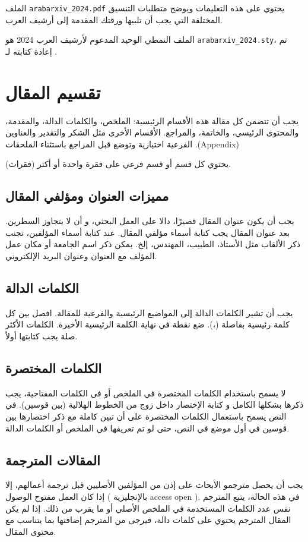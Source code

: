 \documentclass[12pt]{article}
\begin{document}
الملف \verb+arabarxiv_2024.pdf+ يحتوي على هذه التعليمات ويوضح متطلبات التنسيق المختلفة التي يجب أن تلبيها ورقتك المقدمة إلى أرشيف العرب.


الملف النمطي \XeLaTeX{} الوحيد المدعوم لأرشيف العرب 2024 هو \verb+arabarxiv_2024.sty+، تم إعادة كتابته لـ \XeLaTeX{}.

\section{تقسيم المقال}
يجب أن تتضمن كل مقالة هذه الأقسام الرئيسية: الملخص، والكلمات الدالة، والمقدمة، والمحتوى الرئيسي، والخاتمة، والمراجع. الأقسام الأخرى مثل الشكر والتقدير والعناوين الفرعية اختيارية وتوضع قبل المراجع باستثناء الملحقات .(Appendix)

يحتوي كل قسم أو قسم فرعي على فقرة واحدة أو أكثر (فقرات).

\subsection{مميزات العنوان ومؤلفي المقال}
يجب أن يكون عنوان المقال قصيرًا، دالا على العمل البحثي، و أن لا يتجاوز السطرين.
بعد عنوان المقال يجب كتابة أسماء مؤلفي المقال. عند كتابة أسماء المؤلفين، تجنب ذكر الألقاب مثل الأستاذ، الطبيب، المهندس، إلخ. يمكن ذكر اسم الجامعة أو مكان عمل المؤلف مع العنوان وعنوان البريد الإلكتروني.

\subsection{الكلمات الدالة}
يجب أن تشير الكلمات الدالة إلى المواضيع الرئيسية والفرعية للمقالة. افصل بين كل كلمة رئيسية بفاصلة (،). ضع نقطة في نهاية الكلمة الرئيسية الأخيرة. الكلمات الأكثر صلة يجب كتابتها أولاً.

\subsection{الكلمات المختصرة}
لا يسمح باستخدام الكلمات المختصرة في الملخص أو في الكلمات المفتاحية، يجب ذكرها بشكلها الكامل و  كتابة الإختصار داخل زوج من الخطوط الهلالية (بين قوسين).
في النص يسمح باستعمال  الكلمات المختصرة على أن تبين كاملة مع ذكر اختصارها بين قوسين في أول موضع في النص، حتى لو تم تعريفها في الملخص أو الكلمات الدالة.

\subsection{المقالات المترجمة}
 يجب أن يحصل مترجمو الأبحاث على إذن من المؤلفين الأصليين قبل 
 ترجمة أعمالهم، إلا إذا كان العمل مفتوح الوصول ( بالإنجليزية access open ).
 في هذه الحالة، يتبع المترجم نفس عدد الكلمات المستخدمة في الملخص الأصلي أو ما يقرب من ذلك.
 إذا لم يكن المقال المترجم يحتوي على كلمات دالة،  فيرجى من المترجم إضافتها بما يتناسب مع محتوى المقال. 
\end{document}
